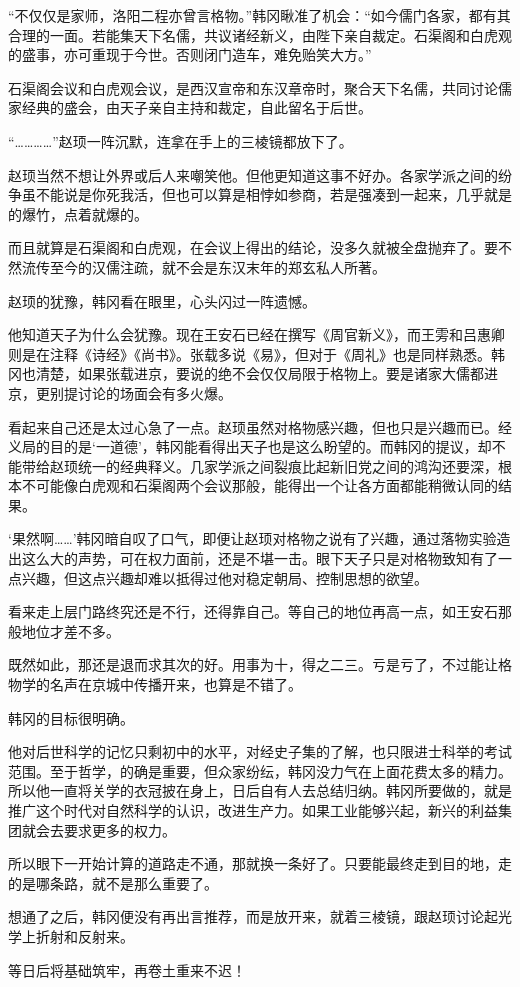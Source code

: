 “不仅仅是家师，洛阳二程亦曾言格物。”韩冈瞅准了机会：“如今儒门各家，都有其合理的一面。若能集天下名儒，共议诸经新义，由陛下亲自裁定。石渠阁和白虎观的盛事，亦可重现于今世。否则闭门造车，难免贻笑大方。”

石渠阁会议和白虎观会议，是西汉宣帝和东汉章帝时，聚合天下名儒，共同讨论儒家经典的盛会，由天子亲自主持和裁定，自此留名于后世。

“…………”赵顼一阵沉默，连拿在手上的三棱镜都放下了。

赵顼当然不想让外界或后人来嘲笑他。但他更知道这事不好办。各家学派之间的纷争虽不能说是你死我活，但也可以算是相悖如参商，若是强凑到一起来，几乎就是的爆竹，点着就爆的。

而且就算是石渠阁和白虎观，在会议上得出的结论，没多久就被全盘抛弃了。要不然流传至今的汉儒注疏，就不会是东汉末年的郑玄私人所著。

赵顼的犹豫，韩冈看在眼里，心头闪过一阵遗憾。

他知道天子为什么会犹豫。现在王安石已经在撰写《周官新义》，而王雱和吕惠卿则是在注释《诗经》《尚书》。张载多说《易》，但对于《周礼》也是同样熟悉。韩冈也清楚，如果张载进京，要说的绝不会仅仅局限于格物上。要是诸家大儒都进京，更别提讨论的场面会有多火爆。

看起来自己还是太过心急了一点。赵顼虽然对格物感兴趣，但也只是兴趣而已。经义局的目的是‘一道德’，韩冈能看得出天子也是这么盼望的。而韩冈的提议，却不能带给赵顼统一的经典释义。几家学派之间裂痕比起新旧党之间的鸿沟还要深，根本不可能像白虎观和石渠阁两个会议那般，能得出一个让各方面都能稍微认同的结果。

‘果然啊……’韩冈暗自叹了口气，即便让赵顼对格物之说有了兴趣，通过落物实验造出这么大的声势，可在权力面前，还是不堪一击。眼下天子只是对格物致知有了一点兴趣，但这点兴趣却难以抵得过他对稳定朝局、控制思想的欲望。

看来走上层门路终究还是不行，还得靠自己。等自己的地位再高一点，如王安石那般地位才差不多。

既然如此，那还是退而求其次的好。用事为十，得之二三。亏是亏了，不过能让格物学的名声在京城中传播开来，也算是不错了。

韩冈的目标很明确。

他对后世科学的记忆只剩初中的水平，对经史子集的了解，也只限进士科举的考试范围。至于哲学，的确是重要，但众家纷纭，韩冈没力气在上面花费太多的精力。所以他一直将关学的衣冠披在身上，日后自有人去总结归纳。韩冈所要做的，就是推广这个时代对自然科学的认识，改进生产力。如果工业能够兴起，新兴的利益集团就会去要求更多的权力。

所以眼下一开始计算的道路走不通，那就换一条好了。只要能最终走到目的地，走的是哪条路，就不是那么重要了。

想通了之后，韩冈便没有再出言推荐，而是放开来，就着三棱镜，跟赵顼讨论起光学上折射和反射来。

等日后将基础筑牢，再卷土重来不迟！

